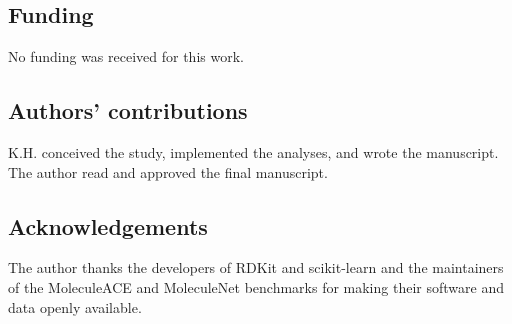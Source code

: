\documentclass[11pt,letterpaper]{article}
\begin{document}
\subsection*{Funding}
No funding was received for this work.

\subsection*{Authors' contributions}
K.H. conceived the study, implemented the analyses, and wrote the manuscript. The author read and approved the final manuscript.

\subsection*{Acknowledgements}
The author thanks the developers of RDKit and scikit-learn and the maintainers of the MoleculeACE and MoleculeNet benchmarks for making their software and data openly available.
\end{document}
